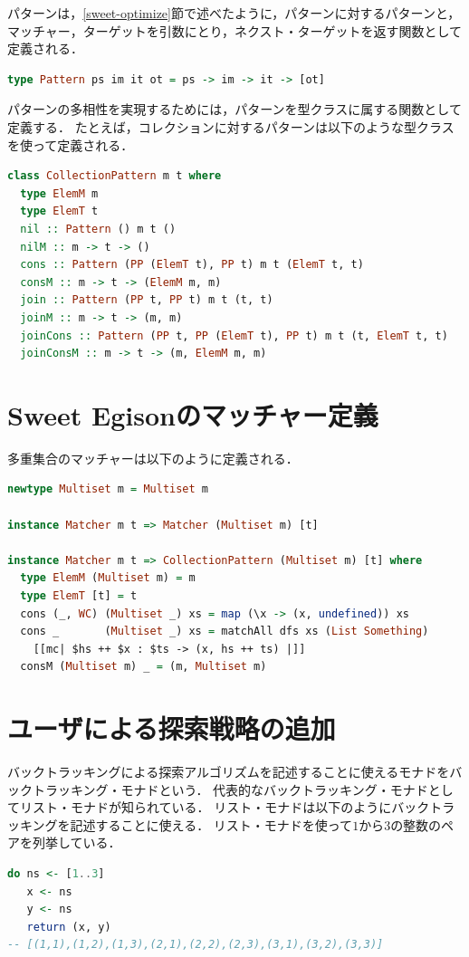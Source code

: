 パターンは，\ref{sweet-optimize}節で述べたように，パターンに対するパターンと，マッチャー，ターゲットを引数にとり，ネクスト・ターゲットを返す関数として定義される．
\begin{lstlisting}[language=haskell,numbers=none]
type Pattern ps im it ot = ps -> im -> it -> [ot]
\end{lstlisting}
パターンの多相性を実現するためには，パターンを型クラスに属する関数として定義する．
たとえば，コレクションに対するパターンは以下のような型クラスを使って定義される．
\begin{lstlisting}[language=haskell,numbers=none]
class CollectionPattern m t where
  type ElemM m
  type ElemT t
  nil :: Pattern () m t ()
  nilM :: m -> t -> ()
  cons :: Pattern (PP (ElemT t), PP t) m t (ElemT t, t)
  consM :: m -> t -> (ElemM m, m)
  join :: Pattern (PP t, PP t) m t (t, t)
  joinM :: m -> t -> (m, m)
  joinCons :: Pattern (PP t, PP (ElemT t), PP t) m t (t, ElemT t, t)
  joinConsM :: m -> t -> (m, ElemM m, m)
\end{lstlisting}

\section{Sweet Egisonのマッチャー定義}\label{sweet-matcher}

多重集合のマッチャーは以下のように定義される．
\begin{lstlisting}[language=haskell,numbers=none]
newtype Multiset m = Multiset m

instance Matcher m t => Matcher (Multiset m) [t]

instance Matcher m t => CollectionPattern (Multiset m) [t] where
  type ElemM (Multiset m) = m
  type ElemT [t] = t
  cons (_, WC) (Multiset _) xs = map (\x -> (x, undefined)) xs
  cons _       (Multiset _) xs = matchAll dfs xs (List Something)
    [[mc| $hs ++ $x : $ts -> (x, hs ++ ts) |]]
  consM (Multiset m) _ = (m, Multiset m)
\end{lstlisting}

\section{ユーザによる探索戦略の追加}\label{sweet-strategy}

バックトラッキングによる探索アルゴリズムを記述することに使えるモナドをバックトラッキング・モナドという．
代表的なバックトラッキング・モナドとしてリスト・モナドが知られている．
リスト・モナドは以下のようにバックトラッキングを記述することに使える．
リスト・モナドを使って$1$から$3$の整数のペアを列挙している．
\begin{lstlisting}[language=haskell,numbers=none]
do ns <- [1..3]
   x <- ns
   y <- ns
   return (x, y)
-- [(1,1),(1,2),(1,3),(2,1),(2,2),(2,3),(3,1),(3,2),(3,3)]
\end{lstlisting}

